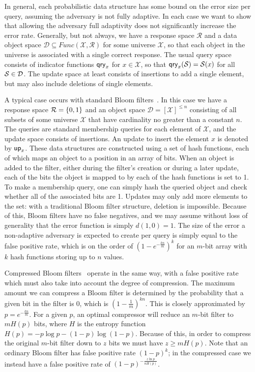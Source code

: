 In general, each probabilistic data structure has some bound on the error size per query, assuming the adversary is not fully adaptive. In each case we want to show that allowing the adversary full adaptivity does not significantly increase the error rate. Generally, but not always, we have a response space $\mathcal{R}$ and a data object space $\mathcal{D} \subseteq Func(\mathcal{X},\mathcal{R})$ for some universe $\mathcal{X}$, so that each object in the universe is associated with a single correct response. The usual query space consists of indicator functions $\mathsf{qry}_x$ for $x \in \mathcal{X}$, so that $\mathsf{qry}_x(\mathcal{S}) = \mathcal{S}(x)$ for all $\mathcal{S} \in \mathcal{D}$. The update space at least consists of insertions to add a single element, but may also include deletions of single elements.

A typical case occurs with standard Bloom filters~\cite{bloomfilter}. In this case we have a response space $\mathcal{R} = \{0,1\}$ and an object space $\mathcal{D} = [\mathcal{X}]^{\le n}$ consisting of all subsets of some universe $\mathcal{X}$ that have cardinality no greater than a constant $n$. The queries are standard membership queries for each element of $\mathcal{X}$, and the update space consists of insertions. An update to insert the element $x$ is denoted by $\mathsf{up}_x$. These data structures are constructed using a set of hash functions, each of which maps an object to a position in an array of bits. When an object is added to the filter, either during the filter's creation or during a later update, each of the bits the object is mapped to by each of the hash functions is set to 1. To make a membership query, one can simply hash the queried object and check whether all of the associated bits are 1. Updates may only add more elements to the set: with a traditional Bloom filter structure, deletion is impossible. Because of this, Bloom filters have no false negatives, and we may assume without loss of generality that the error function is simply $d(1,0) = 1$. The size of the error a non-adaptive adversary is expected to create per query is simply equal to the false positive rate, which is on the order of $(1-e^{-\frac{kn}{m}})^k$ for an $m$-bit array with $k$ hash functions storing up to $n$ values.

Compressed Bloom filters~\cite{xxx} operate in the same way, with a false positive rate which must also take into account the degree of compression. The maximum amount we can compress a Bloom filter is determined by the probability that a given bit in the filter is 0, which is $\left(1-\frac{1}{m}\right)^{kn}$. This is closely approximated by $p = e^{-\frac{kn}{m}}$. For a given $p$, an optimal compressor will reduce an $m$-bit filter to $mH(p)$ bits, where $H$ is the entropy function $H(p) = -p\log p - (1-p)\log(1-p)$. Because of this, in order to compress the original $m$-bit filter down to $z$ bits we must have $z \ge mH(p)$. Note that an ordinary Bloom filter has false positive rate $(1-p)^k$; in the compressed case we instead have a false positive rate of $(1-p)^{-\frac{z \ln p}{nH(p)}}$.

